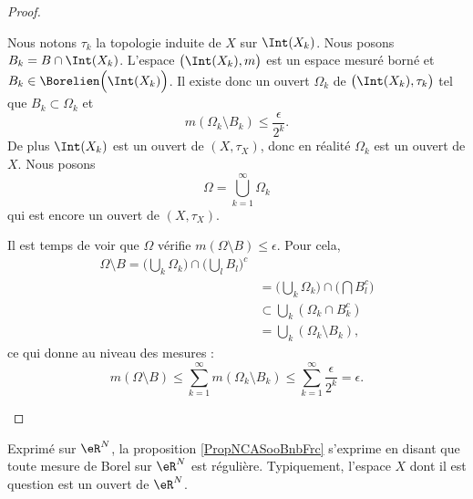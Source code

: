 \begin{proof}
\begin{subproof}
    Nous notons \( \tau_k\) la topologie induite de \( X\) sur \( \Int(X_k)\). Nous posons \( B_k=B\cap\Int(X_k)\). L'espace \( \big( \Int(X_k),m \big)\) est un espace mesuré borné et \( B_k\in \Borelien\Big( \Int(X_k) \Big)\). Il existe donc un ouvert \( \Omega_k\) de \( \big( \Int(X_k),\tau_k \big)\) tel que \( B_k\subset \Omega_k\) et 
    \begin{equation}
        m(\Omega_k\setminus B_k)\leq \frac{ \epsilon }{ 2^k }.
    \end{equation}
    De plus \( \Int(X_k)\) est un ouvert de \( (X,\tau_X)\), donc en réalité \( \Omega_k\) est un ouvert de \( X\). Nous posons
    \begin{equation}
        \Omega=\bigcup_{k=1}^{\infty}\Omega_k
    \end{equation}
    qui est encore un ouvert de \( (X,\tau_X)\). 
    
    Il est temps de voir que \( \Omega\) vérifie \( m(\Omega\setminus B)\leq \epsilon\). Pour cela,
    \begin{subequations}
        \begin{align}
            \Omega\setminus B=\big( \bigcup_k\Omega_k \big)\cap\big( \bigcup_lB_l \big)^c\\
            &=\big( \bigcup_k\Omega_k \big)\cap\big( \bigcap B_l^c \big)\\
            &\subset\bigcup_k(\Omega_k\cap B_k^c)\\
            &=\bigcup_k(\Omega_k\setminus B_k),
        \end{align}
    \end{subequations}
    ce qui donne au niveau des mesures :
    \begin{equation}
        m(\Omega\setminus B)\leq\sum_{k=1}^{\infty}m(\Omega_k\setminus B_k)\leq\sum_{k=1}^{\infty}\frac{ \epsilon }{ 2^k }=\epsilon.
    \end{equation}
    \end{subproof}
\end{proof}

\begin{remark}      \label{RemooOAGCooRHpjxd}
    Exprimé sur \( \eR^N\), la proposition \ref{PropNCASooBnbFrc} s'exprime en disant que toute mesure de Borel sur \( \eR^N\) est régulière. Typiquement, l'espace \( X\) dont il est question est un ouvert de \( \eR^N\).
\end{remark}

